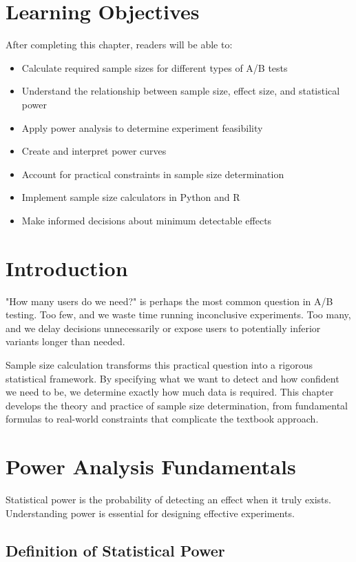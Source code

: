 \section{Learning Objectives}

After completing this chapter, readers will be able to:
\begin{itemize}
    \item Calculate required sample sizes for different types of A/B tests
    \item Understand the relationship between sample size, effect size, and statistical power
    \item Apply power analysis to determine experiment feasibility
    \item Create and interpret power curves
    \item Account for practical constraints in sample size determination
    \item Implement sample size calculators in Python and R
    \item Make informed decisions about minimum detectable effects
\end{itemize}

\section{Introduction}

"How many users do we need?" is perhaps the most common question in A/B testing. Too few, and we waste time running inconclusive experiments. Too many, and we delay decisions unnecessarily or expose users to potentially inferior variants longer than needed.

Sample size calculation transforms this practical question into a rigorous statistical framework. By specifying what we want to detect and how confident we need to be, we determine exactly how much data is required. This chapter develops the theory and practice of sample size determination, from fundamental formulas to real-world constraints that complicate the textbook approach.

\section{Power Analysis Fundamentals}

Statistical power is the probability of detecting an effect when it truly exists. Understanding power is essential for designing effective experiments.

\subsection{Definition of Statistical Power}

